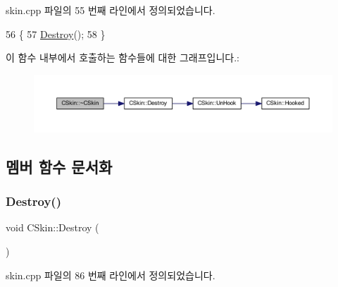 skin.\+cpp 파일의 55 번째 라인에서 정의되었습니다.


\begin{DoxyCode}
56 \{
57   \mbox{\hyperlink{class_c_skin_a13edf7704211f61440871e17eda1d216}{Destroy}}();
58 \}
\end{DoxyCode}
이 함수 내부에서 호출하는 함수들에 대한 그래프입니다.\+:
\nopagebreak
\begin{figure}[H]
\begin{center}
\leavevmode
\includegraphics[width=350pt]{class_c_skin_a206a4d1b135da1869bdf786aba217c2b_cgraph}
\end{center}
\end{figure}


\subsection{멤버 함수 문서화}
\mbox{\label{class_c_skin_a13edf7704211f61440871e17eda1d216}} 
\subsubsection{\texorpdfstring{Destroy()}{Destroy()}}
{\footnotesize\ttfamily void C\+Skin\+::\+Destroy (\begin{DoxyParamCaption}{ }\end{DoxyParamCaption})}



skin.\+cpp 파일의 86 번째 라인에서 정의되었습니다.


